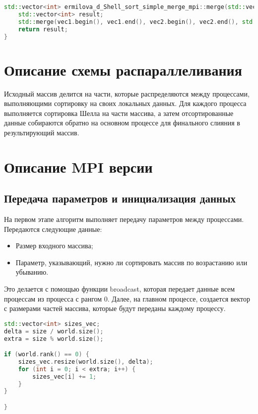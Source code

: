 \documentclass[a4paper,12pt]{article}
\begin{document}
\begin{lstlisting}[language=C++,caption={Функция merge}]
std::vector<int> ermilova_d_Shell_sort_simple_merge_mpi::merge(std::vector<int>& vec1, std::vector<int>& vec2, const std::function<bool(int, int)>& comp) {
    std::vector<int> result;
    std::merge(vec1.begin(), vec1.end(), vec2.begin(), vec2.end(), std::back_inserter(result), comp);
    return result;
}
\end{lstlisting}
\newpage

\section{Описание схемы распараллеливания}
Исходный массив делится на части, которые распределяются между процессами, выполняющими сортировку на своих локальных данных. Для каждого процесса выполняется сортировка Шелла на части массива, а затем отсортированные данные собираются обратно на основном процессе для финального слияния в результирующий массив.
\newpage

\section{Описание MPI версии}
\subsection{Передача параметров и инициализация данных}
На первом этапе алгоритм выполняет передачу параметров между процессами. Передаются следующие данные:
\begin{itemize}
    \item Размер входного массива;
    \item Параметр, указывающий, нужно ли сортировать массив по возрастанию или убыванию.
\end{itemize}

Это делается с помощью функции broadcast, которая передает данные всем процессам из процесса с рангом 0.
Далее, на главном процессе, создается вектор с размерами частей массива, которые будут переданы каждому процессу.


\begin{lstlisting}[language=C++,caption={Передача параметров и инициализация данных}]
std::vector<int> sizes_vec;
delta = size / world.size(); 
extra = size % world.size(); 

if (world.rank() == 0) {
    sizes_vec.resize(world.size(), delta);
    for (int i = 0; i < extra; i++) {
        sizes_vec[i] += 1;
    }
}

}
\end{lstlisting}
\end{document}
